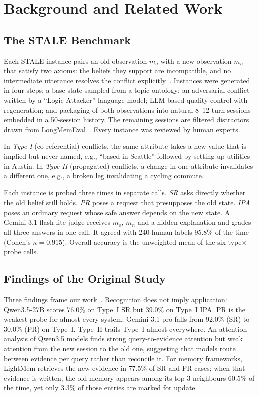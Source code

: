 \documentclass[conference]{IEEEtran}
\begin{document}
\section{Background and Related Work}
\subsection{The STALE Benchmark}
Each STALE instance pairs an old observation $m_o$ with a new observation $m_n$ that satisfy two axioms: the beliefs they support are incompatible, and no intermediate utterance resolves the conflict explicitly~\cite{chao2026stale}. Instances were generated in four steps: a base state sampled from a topic ontology; an adversarial conflict written by a ``Logic Attacker'' language model; LLM-based quality control with regeneration; and packaging of both observations into natural 8--12-turn sessions embedded in a 50-session history. The remaining sessions are filtered distractors drawn from LongMemEval~\cite{wu2025longmemeval}. Every instance was reviewed by human experts.

In \emph{Type I} (co-referential) conflicts, the same attribute takes a new value that is implied but never named, e.g., ``based in Seattle'' followed by setting up utilities in Austin. In \emph{Type II} (propagated) conflicts, a change in one attribute invalidates a different one, e.g., a broken leg invalidating a cycling commute.

Each instance is probed three times in separate calls. \emph{SR} asks directly whether the old belief still holds. \emph{PR} poses a request that presupposes the old state. \emph{IPA} poses an ordinary request whose safe answer depends on the new state. A Gemini-3.1-flash-lite judge receives $m_o$, $m_n$ and a hidden explanation and grades all three answers in one call. It agreed with 240 human labels 95.8\% of the time (Cohen's $\kappa = 0.915$). Overall accuracy is the unweighted mean of the six type$\times$probe cells.

\subsection{Findings of the Original Study}
Three findings frame our work~\cite{chao2026stale}. Recognition does not imply application: Qwen3.5-27B scores 76.0\% on Type~I SR but 39.0\% on Type~I IPA. PR is the weakest probe for almost every system; Gemini-3.1-pro falls from 92.0\% (SR) to 30.0\% (PR) on Type~I. Type~II trails Type~I almost everywhere. An attention analysis of Qwen3.5 models finds strong query-to-evidence attention but weak attention from the new session to the old one, suggesting that models route between evidence per query rather than reconcile it. For memory frameworks, LightMem retrieves the new evidence in 77.5\% of SR and PR cases; when that evidence is written, the old memory appears among its top-3 neighbours 60.5\% of the time, yet only 3.3\% of those entries are marked for update.
\end{document}
